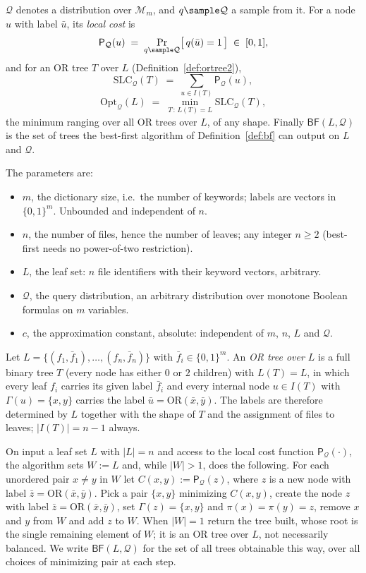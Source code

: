 \documentclass{conjura-conjecture}
\newcommand{\bits}{\{0,1\}}
\newcommand{\Qd}{\mathcal{Q}}
\newcommand{\Mon}{\mathcal{M}}
\newcommand{\ORv}{\mathrm{OR}}
\newcommand{\Pcost}{\mathsf{P}}
\newcommand{\SLC}{\mathrm{SLC}}
\newcommand{\Opt}{\mathrm{Opt}}
\newcommand{\BF}{\mathsf{BF}}
\begin{document}
$\Qd$ denotes a distribution over $\Mon_m$, and $q \sample \Qd$ a sample
from it. For a node $u$ with label $\bar u$, its \emph{local cost} is
\[
  \Pcost_{\Qd}(u) \;=\; \Pr_{q \sample \Qd}\bigl[\,q(\bar u) = 1\,\bigr]
  \;\in\; [0,1],
\]
and for an OR tree $T$ over $L$ (Definition~\ref{def:ortree2}),
\[
  \SLC_{\Qd}(T) \;=\; \sum_{u \in I(T)} \Pcost_{\Qd}(u),
\]
\[
  \Opt_{\Qd}(L) \;=\; \min_{T \,:\, L(T) = L} \SLC_{\Qd}(T),
\]
the minimum ranging over all OR trees over $L$, of any shape. Finally
$\BF(L,\Qd)$ is the set of trees the best-first algorithm of
Definition~\ref{def:bf} can output on $L$ and $\Qd$.

The parameters are:
\begin{itemize}
\item $m$, the dictionary size, i.e.\ the number of keywords; labels are
  vectors in $\bits^m$. Unbounded and independent of $n$.
\item $n$, the number of files, hence the number of leaves; any integer
  $n \ge 2$ (best-first needs no power-of-two restriction).
\item $L$, the leaf set: $n$ file identifiers with their keyword
  vectors, arbitrary.
\item $\Qd$, the query distribution, an arbitrary distribution over
  monotone Boolean formulas on $m$ variables.
\item $c$, the approximation constant, absolute: independent of $m$,
  $n$, $L$ and $\Qd$.
\end{itemize}

\begin{definition}\label{def:ortree2}
Let $L = \{(f_1,\bar f_1),\dots,(f_n,\bar f_n)\}$ with
$\bar f_i \in \bits^m$. An \emph{OR tree over $L$} is a full binary tree
$T$ (every node has either $0$ or $2$ children) with $L(T) = L$, in which
every leaf $f_i$ carries its given label $\bar f_i$ and every internal
node $u \in I(T)$ with $\Gamma(u) = \{x,y\}$ carries the label
$\bar u = \ORv(\bar x, \bar y)$. The labels are therefore determined by
$L$ together with the shape of $T$ and the assignment of files to leaves;
$|I(T)| = n - 1$ always.
\end{definition}

\begin{definition}[the best-first algorithm $\BF$]\label{def:bf}
On input a leaf set $L$ with $|L| = n$ and access to the local cost
function $\Pcost_{\Qd}(\cdot)$, the algorithm sets $W := L$ and, while
$|W| > 1$, does the following. For each unordered pair $x \neq y$ in $W$
let $C(x,y) := \Pcost_{\Qd}(z)$, where $z$ is a new node with label
$\bar z = \ORv(\bar x, \bar y)$. Pick a pair $\{x,y\}$ minimizing
$C(x,y)$, create the node $z$ with label
$\bar z = \ORv(\bar x,\bar y)$, set $\Gamma(z) = \{x,y\}$ and
$\pi(x) = \pi(y) = z$, remove $x$ and $y$ from $W$ and add $z$ to $W$.
When $|W| = 1$ return the tree built, whose root is the single remaining
element of $W$; it is an OR tree over $L$, not necessarily balanced. We
write $\BF(L,\Qd)$ for the set of all trees obtainable this way, over all
choices of minimizing pair at each step.
\end{definition}
\end{document}
